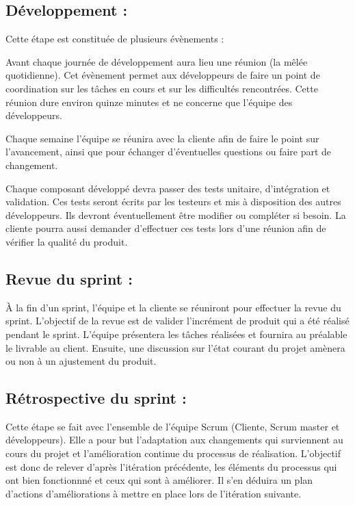 \documentclass{../res/univ-projet}
\begin{document}
\subsection{Développement :} 

Cette étape est constituée de plusieurs évènements :

Avant chaque journée de développement aura lieu une réunion (la mêlée quotidienne). Cet évènement permet aux 
développeurs de faire un point de coordination sur les tâches en cours et sur les difficultés rencontrées. Cette réunion dure environ quinze minutes et ne 
concerne que l'équipe des développeurs.

Chaque semaine l'équipe se réunira avec la cliente afin de faire le point sur l'avancement, ainsi que pour échanger d'éventuelles questions ou faire part 
de changement.

Chaque composant développé devra passer des tests unitaire, d'intégration et validation. Ces tests seront écrits par les testeurs et mis à disposition des autres 
développeurs. Ils devront éventuellement être modifier ou compléter si besoin. La cliente pourra aussi demander d'effectuer ces tests lors d'une réunion afin 
de vérifier la qualité du produit.

\subsection{Revue du sprint :} 

\`{A} la fin d'un sprint, l'équipe et la cliente se réuniront pour effectuer la revue du sprint. L'objectif de la revue est de valider l'incrément de produit 
qui a été réalisé pendant le sprint. L'équipe présentera les tâches réalisées et fournira au préalable le livrable au client. Ensuite, une discussion sur 
l'état courant du projet amènera ou non à un ajustement du produit. 

\subsection{Rétrospective du sprint :} 

Cette étape se fait avec l'ensemble de l'équipe Scrum (Cliente, Scrum master et développeurs). Elle a pour but l'adaptation aux changements qui surviennent au 
cours du projet et l'amélioration continue du processus de réalisation. L'objectif est donc de relever d'après l'itération précédente, les éléments du processus 
qui ont bien fonctionnné et ceux qui sont à améliorer. Il s'en déduira un plan d'actions d'améliorations à mettre en place lors de l'itération suivante.
\end{document}
